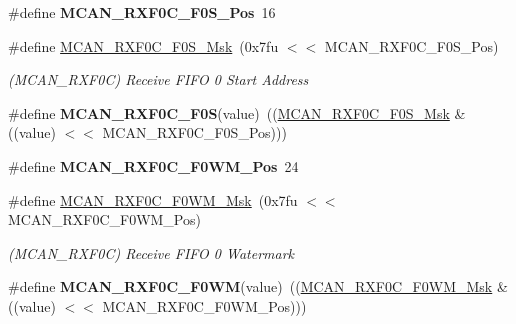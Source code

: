 \begin{DoxyCompactItemize}
\#define {\bfseries M\+C\+A\+N\+\_\+\+R\+X\+F0\+C\+\_\+\+F0\+S\+\_\+\+Pos}~16
\item 
\mbox{\label{group__SAMV71__MCAN_ga26137d13d8f4ba1a43a44ef6e4b09a14}} 
\#define \mbox{\hyperlink{group__SAMV71__MCAN_ga26137d13d8f4ba1a43a44ef6e4b09a14}{M\+C\+A\+N\+\_\+\+R\+X\+F0\+C\+\_\+\+F0\+S\+\_\+\+Msk}}~(0x7fu $<$$<$ M\+C\+A\+N\+\_\+\+R\+X\+F0\+C\+\_\+\+F0\+S\+\_\+\+Pos)
\begin{DoxyCompactList}\small\item\em (M\+C\+A\+N\+\_\+\+R\+X\+F0C) Receive F\+I\+FO 0 Start Address \end{DoxyCompactList}\item 
\mbox{\label{group__SAMV71__MCAN_gae6295a9323fd773a32f55841da7c69b8}} 
\#define {\bfseries M\+C\+A\+N\+\_\+\+R\+X\+F0\+C\+\_\+\+F0S}(value)~((\mbox{\hyperlink{group__SAMV71__MCAN_ga26137d13d8f4ba1a43a44ef6e4b09a14}{M\+C\+A\+N\+\_\+\+R\+X\+F0\+C\+\_\+\+F0\+S\+\_\+\+Msk}} \& ((value) $<$$<$ M\+C\+A\+N\+\_\+\+R\+X\+F0\+C\+\_\+\+F0\+S\+\_\+\+Pos)))
\item 
\mbox{\label{group__SAMV71__MCAN_gaa1e012aed8a6f9172868aada149954b3}} 
\#define {\bfseries M\+C\+A\+N\+\_\+\+R\+X\+F0\+C\+\_\+\+F0\+W\+M\+\_\+\+Pos}~24
\item 
\mbox{\label{group__SAMV71__MCAN_ga02cd1c4c01586019d4e9bb59aa0b2dd8}} 
\#define \mbox{\hyperlink{group__SAMV71__MCAN_ga02cd1c4c01586019d4e9bb59aa0b2dd8}{M\+C\+A\+N\+\_\+\+R\+X\+F0\+C\+\_\+\+F0\+W\+M\+\_\+\+Msk}}~(0x7fu $<$$<$ M\+C\+A\+N\+\_\+\+R\+X\+F0\+C\+\_\+\+F0\+W\+M\+\_\+\+Pos)
\begin{DoxyCompactList}\small\item\em (M\+C\+A\+N\+\_\+\+R\+X\+F0C) Receive F\+I\+FO 0 Watermark \end{DoxyCompactList}\item 
\mbox{\label{group__SAMV71__MCAN_ga6484667044b20380070806df4abfd478}} 
\#define {\bfseries M\+C\+A\+N\+\_\+\+R\+X\+F0\+C\+\_\+\+F0\+WM}(value)~((\mbox{\hyperlink{group__SAMV71__MCAN_ga02cd1c4c01586019d4e9bb59aa0b2dd8}{M\+C\+A\+N\+\_\+\+R\+X\+F0\+C\+\_\+\+F0\+W\+M\+\_\+\+Msk}} \& ((value) $<$$<$ M\+C\+A\+N\+\_\+\+R\+X\+F0\+C\+\_\+\+F0\+W\+M\+\_\+\+Pos)))
\item 
\mbox{\label{group__SAMV71__MCAN_ga9a057dce6dd1d895ca556ec2bead5062}} 

\end{DoxyCompactItemize}
